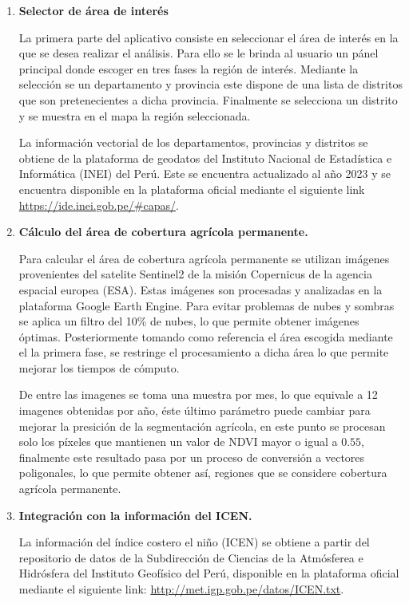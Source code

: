     \begin{enumerate}[label=\thesubsection.\arabic*, leftmargin=1.5cm]
      \item \textbf{Selector de área de interés}
      
      La primera parte del aplicativo consiste en seleccionar el área de interés en la que se desea realizar el análisis. Para ello se le brinda al usuario un pánel principal donde escoger en tres fases la región de interés. Mediante la selección se un departamento y provincia este dispone de una lista de distritos que son pretenecientes a dicha provincia. Finalmente se selecciona un distrito y se muestra en el mapa la región seleccionada.

      La información vectorial de los departamentos, provincias y distritos se obtiene de la plataforma de geodatos del Instituto Nacional de Estadística e Informática (INEI) del Perú. Este se encuentra actualizado al año 2023 y se encuentra disponible en la plataforma oficial mediante el siguiente link \href{https://ide.inei.gob.pe/#capas/}{https://ide.inei.gob.pe/\#capas/}.

      \item \textbf{Cálculo del área de cobertura agrícola permanente.}
      
      Para calcular el área de cobertura agrícola permanente se utilizan imágenes provenientes del satelite Sentinel2 de la misión Copernicus de la agencia espacial europea (ESA). Estas imágenes son procesadas y analizadas en la plataforma Google Earth Engine. Para evitar problemas de nubes y sombras se aplica un filtro del 10\% de nubes, lo que permite obtener imágenes óptimas. Posteriormente tomando como referencia el área escogida mediante el la primera fase, se restringe el procesamiento a dicha área lo que permite mejorar los tiempos de cómputo.

      De entre las imagenes se toma una muestra por mes, lo que equivale a 12 imagenes obtenidas por año, éste último parámetro puede cambiar para mejorar la presición de la segmentación agrícola, en este punto se procesan solo los píxeles que mantienen un valor de NDVI mayor o igual a $0.55$, finalmente este resultado pasa por un proceso de conversión a vectores poligonales, lo que permite obtener así, regiones que se considere cobertura agrícola permanente.

      \item \textbf{Integración con la información del ICEN.}
      
      La información del índice costero el niño (ICEN) se obtiene a partir del repositorio de datos de la Subdirección de Ciencias de la Atmósferea e Hidrósfera del Instituto Geofísico del Perú, disponible en la plataforma oficial mediante el siguiente link: \href{http://met.igp.gob.pe/datos/ICEN.txt}{http://met.igp.gob.pe/datos/ICEN.txt}.
      

\end{enumerate}
